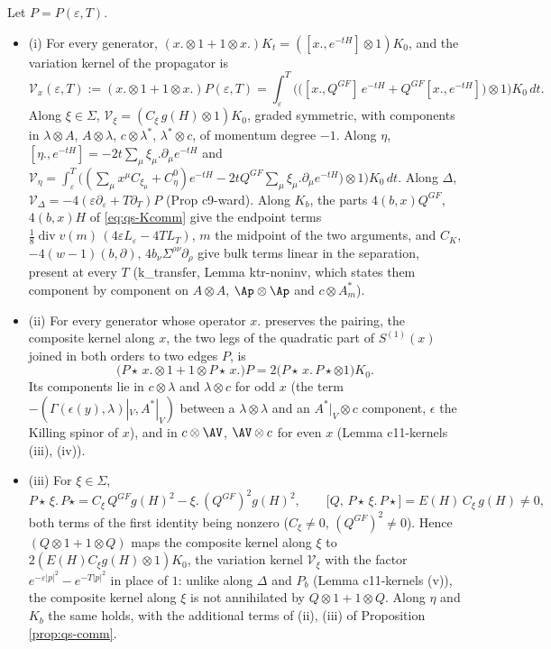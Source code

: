 \begin{corollary}
\label{cor:qs-edges}
Let $P=P(\varepsilon,T)$.
\begin{itemize}
\item (i) For every generator, $(x.\otimes1+1\otimes x.)K_t=([x.,e^{-tH}]\otimes1)K_0$, and the variation kernel of the propagator is
\[
\mathcal V_x(\varepsilon,T):=(x.\otimes1+1\otimes x.)P(\varepsilon,T)=\int_\varepsilon^T\Big(\big([x.,Q^{GF}]\,e^{-tH}+Q^{GF}[x.,e^{-tH}]\big)\otimes1\Big)K_0\,dt .
\]
Along $\xi\in\Sigma$, $\mathcal V_\xi=(C_\xi\,g(H)\otimes1)K_0$, graded symmetric, with components in $\lambda\otimes A$, $A\otimes\lambda$, $c\otimes\lambda^*$, $\lambda^*\otimes c$, of momentum degree $-1$. Along $\eta$, $[\eta.,e^{-tH}]=-2t\sum_\mu\xi_\mu.\partial_\mu e^{-tH}$ and $\mathcal V_\eta=\int_\varepsilon^T\big((\sum_\mu x^\mu C_{\xi_\mu}+C^0_\eta)e^{-tH}-2tQ^{GF}\sum_\mu\xi_\mu.\partial_\mu e^{-tH}\big)\otimes1\big)K_0\,dt$. Along $\Delta$, $\mathcal V_\Delta=-4(\varepsilon\partial_\varepsilon+T\partial_T)P$ (Prop c9-ward). Along $K_b$, the parts $4(b,x)Q^{GF}$, $4(b,x)H$ of \eqref{eq:qs-Kcomm} give the endpoint terms $\tfrac18\operatorname{div}v(m)\,(4\varepsilon L_\varepsilon-4TL_T)$, $m$ the midpoint of the two arguments, and $C_K$, $-4(w-1)(b,\partial)$, $4b_\nu\Sigma^{\rho\nu}\partial_\rho$ give bulk terms linear in the separation, present at every $T$ (k\_transfer, Lemma ktr-noninv, which states them component by component on $A\otimes A$, $\Ap\otimes\Ap$ and $c\otimes A^*_m$).
\item (ii) For every generator whose operator $x.$ preserves the pairing, the composite kernel along $x$, the two legs of the quadratic part of $S^{(1)}(x)$ joined in both orders to two edges $P$, is
\[
\big(P\star\,x.\otimes1+1\otimes P\star\,x.\big)P=2\big(P\star\,x.\,P\star\otimes1\big)K_0 .
\]
Its components lie in $c\otimes\lambda$ and $\lambda\otimes c$ for odd $x$ (the term $-(\Gamma(\epsilon(y),\lambda)|_V,A^*|_V)$ between a $\lambda\otimes\lambda$ and an $A^*|_V\otimes c$ component, $\epsilon$ the Killing spinor of $x$), and in $c\otimes\AV$, $\AV\otimes c$ for even $x$ (Lemma c11-kernels (iii), (iv)).
\item (iii) For $\xi\in\Sigma$,
\[
P\star\,\xi.\,P\star=C_\xi\,Q^{GF}g(H)^2-\xi.\,(Q^{GF})^2g(H)^2,\qquad \big[Q,\,P\star\,\xi.\,P\star\big]=E(H)\,C_\xi\,g(H)\neq0 ,
\]
both terms of the first identity being nonzero ($C_\xi\neq0$, $(Q^{GF})^2\neq0$). Hence $(Q\otimes1+1\otimes Q)$ maps the composite kernel along $\xi$ to $2(E(H)C_\xi g(H)\otimes1)K_0$, the variation kernel $\mathcal V_\xi$ with the factor $e^{-\varepsilon|p|^2}-e^{-T|p|^2}$ in place of $1$: unlike along $\Delta$ and $P_b$ (Lemma c11-kernels (v)), the composite kernel along $\xi$ is not annihilated by $Q\otimes1+1\otimes Q$. Along $\eta$ and $K_b$ the same holds, with the additional terms of (ii), (iii) of Proposition \ref{prop:qs-comm}.

\end{itemize}
\end{corollary}

